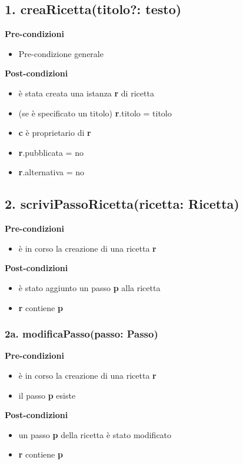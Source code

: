 \documentclass[14pt]{extarticle}
\begin{document}
\subsection*{1. creaRicetta(titolo?: testo)}
\textbf{Pre-condizioni}
\begin{itemize}
  \item Pre-condizione generale
\end{itemize}
\textbf{Post-condizioni}
\begin{itemize}
  \item è stata creata una istanza \textbf{r} di ricetta
  \item (se è specificato un titolo) \textbf{r}.titolo = titolo
  \item \textbf{c} è proprietario di \textbf{r}
  \item \textbf{r}.pubblicata = no
  \item \textbf{r}.alternativa = no
\end{itemize}

\subsection*{2. scriviPassoRicetta(ricetta: Ricetta)}

\textbf{Pre-condizioni} 	
\begin{itemize}
  \item è in corso la creazione di una ricetta  \textbf{r}
\end{itemize}
\textbf{Post-condizioni}
\begin{itemize}
  \item è stato aggiunto un passo  \textbf{p} alla ricetta
  \item  \textbf{r} contiene  \textbf{p}
\end{itemize}

\subsubsection*{2a. modificaPasso(passo: Passo)}

\textbf{Pre-condizioni}
\begin{itemize}
  \item è in corso la creazione di una ricetta  \textbf{r}
  \item il passo  \textbf{p} esiste
\end{itemize}
\textbf{Post-condizioni}
\begin{itemize}
  \item un passo  \textbf{p} della ricetta è stato modificato
  \item  \textbf{r} contiene  \textbf{p}
\end{itemize}
\end{document}
